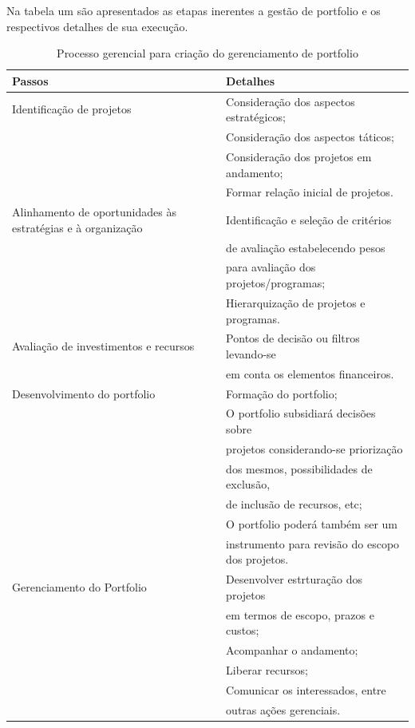 \documentclass[12pt,a4paper,ruledheader,tocpage=prefix,floatnumber=continuous,pagestart=folhaderosto,font=times]{abnt}
\begin{document}
Na tabela um são apresentados as etapas inerentes a gestão de portfolio e os respectivos detalhes de sua execução.

\begin{table}[H]
\begin{center}
 \begin{tabular}{| >{\centering\arraybackslash}m{2in} | >{\centering\arraybackslash}m{4in} |}
  \hline
  Passos & Detalhes \\
  \hline
  Identificação de projetos & Consideração dos aspectos estratégicos; \\
			    & Consideração dos aspectos táticos; \\
                            & Consideração dos projetos em andamento; \\
			    & Formar relação inicial de projetos. \\
  \hline
  Alinhamento de oportunidades às estratégias e à organização & Identificação e seleção  de critérios\\ 
							      & de avaliação estabelecendo pesos\\
							      & para avaliação dos projetos/programas;\\
							      & Hierarquização de projetos e programas.\\    
  \hline
  Avaliação de investimentos e recursos  & Pontos de decisão ou filtros levando-se\\
					 & em conta os elementos financeiros.\\
  \hline
  Desenvolvimento do portfolio & Formação do portfolio;\\ 
			       & O portfolio subsidiará decisões sobre\\
                               & projetos considerando-se priorização\\
			       & dos mesmos, possibilidades de exclusão,\\
                               & de inclusão de recursos, etc;\\
			       & O portfolio poderá também ser um\\
		               & instrumento para revisão do escopo dos projetos.\\
  \hline
  Gerenciamento do Portfolio   & Desenvolver estrturação dos projetos\\
			       & em termos de escopo, prazos e custos;\\
                               & Acompanhar o andamento;\\
                               & Liberar recursos;\\
                               & Comunicar os interessados, entre\\
			       & outras ações gerenciais.\\			      
  \hline			
 \end{tabular}
\caption{Processo gerencial para criação do gerenciamento de portfolio\cite{crawford}}
\end{center}
\end{table}
\end{document}
